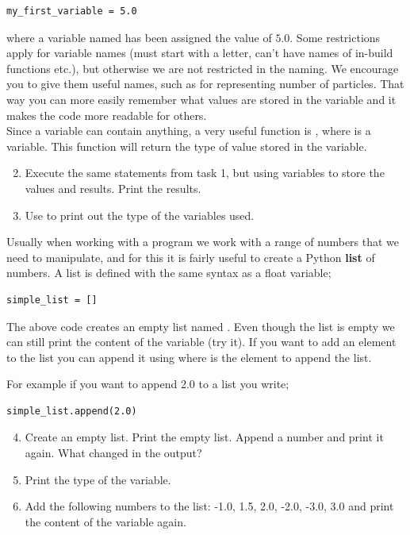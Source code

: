 \documentclass{article}
\begin{document}
\begin{lstlisting}
my_first_variable = 5.0
\end{lstlisting}

where a variable named  has been assigned the value
of $5.0$.
Some restrictions apply for variable names (must start with a letter, can't have names of
in-build functions etc.), but otherwise we are not restricted in the naming. We encourage you to give
them useful names, such as  for representing number of
particles. That way you can more easily remember what values are stored in the variable
and it makes the code more readable for others.\\

Since a variable can contain anything, a very useful function is ,
where  is a variable. This function will return the type of value stored
in the variable.

\begin{enumerate}
  \setcounter{enumi}{1}
  \item Execute the same statements from task 1, but using variables to store
    the values and results. Print the results.
  \item Use  to print out the type of the variables used.
\end{enumerate}

Usually when working with a program we work with a range of numbers
that we need to manipulate, and for this it is fairly useful to create a Python {\bf list}
of numbers.
A list is defined with the same syntax as a float variable;

\begin{lstlisting}
simple_list = []
\end{lstlisting}

The above code creates an empty list named .
Even though the list is empty we can still print
the content of the variable (try it).
If you want to add an element to the list you can
append it using  where  is the element to append the list.

For example if you want to append 2.0 to a list you write;

\begin{lstlisting}
simple_list.append(2.0)
\end{lstlisting}

\begin{enumerate}
  \setcounter{enumi}{3}
  \item Create an empty list.
    Print the empty list.
    Append a number and print it again.
    What changed in the output?

  \item Print the type of the variable.

  \item Add the following numbers to the list: -1.0, 1.5, 2.0, -2.0, -3.0, 3.0 and
    print the content of the variable again.
\end{enumerate}
\end{document}
